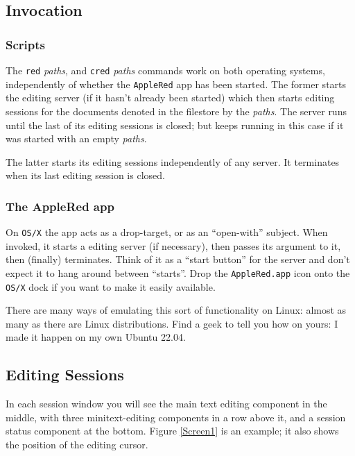 \documentclass[11pt,a4paper]{article}
\begin{document}
\subsection{Invocation}\label{invocation}
\subsubsection{Scripts}\label{scripts}

The \texttt{red} \emph{paths}, and \texttt{cred} \emph{paths}
commands work on both operating systems, independently of whether
the \texttt{AppleRed} app has been started. The former starts the
editing server (if it hasn't already been started) which then starts
editing sessions for the documents denoted in the filestore by the
\emph{paths}. The server runs until the last of its editing sessions
is closed; but keeps running in this case if it was started with
an empty \emph{paths}.

The latter starts its editing sessions independently of any server. It
terminates when its last editing session is closed.

\subsubsection{The AppleRed app}\label{theappleredapp}
On \texttt{OS/X} the app acts as a drop-target, or as an ``open-with''
subject. When invoked, it starts a editing server (if necessary), then
passes its argument to it, then (finally) terminates. Think of it as a
``start button'' for the server and don't expect it to hang around
between ``starts''. Drop the \texttt{AppleRed.app} icon onto the
\texttt{OS/X} dock if you want to make it easily available.

There are many ways of emulating this sort of functionality on
Linux: almost as many as there are Linux distributions. Find a
geek to tell you how on yours: I made it happen on my own Ubuntu 22.04.

\hypertarget{editing-sessions}{%
\subsection{Editing Sessions}\label{editing-sessions}}

In each session window you will see the main text editing
component in the middle, with three minitext-editing components in a row
above it, and a session status component at the bottom. Figure \ref{Screen1}
is an example; it also shows the position of the editing cursor.
\end{document}
